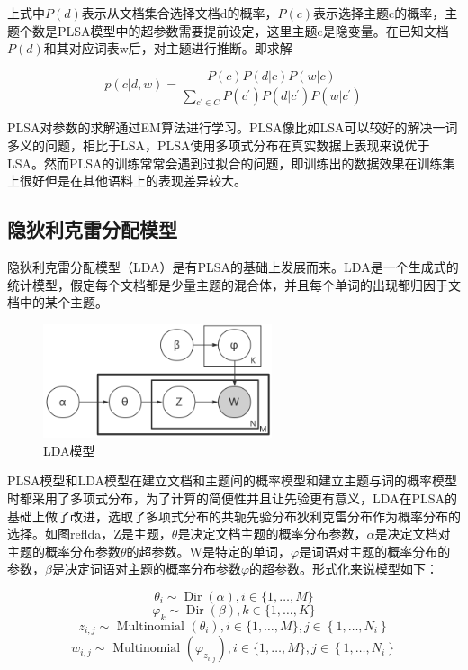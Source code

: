 \documentclass[winfonts,master,oneside,nobackinfo]{njuthesis}
\begin{document}
上式中$P ( d )$表示从文档集合选择文档d的概率，$P ( c )$表示选择主题c的概率，主题个数是PLSA模型中的超参数需要提前设定，这里主题c是隐变量。在已知文档$P ( d )$和其对应词表w后，对主题进行推断。即求解

$$p ( c | d , w ) = \frac { P ( c ) P ( d | c ) P ( w | c ) } { \sum _ { c ^ { \prime } \in C } P \left( c ^ { \prime } \right) P ( d | c ^ { \prime } ) P ( w | c ^ { \prime } ) }$$

PLSA对参数的求解通过EM算法进行学习。PLSA像比如LSA可以较好的解决一词多义的问题，相比于LSA，PLSA使用多项式分布在真实数据上表现来说优于LSA。然而PLSA的训练常常会遇到过拟合的问题，即训练出的数据效果在训练集上很好但是在其他语料上的表现差异较大。

\subsection{隐狄利克雷分配模型}

隐狄利克雷分配模型（LDA）是有PLSA的基础上发展而来。LDA是一个生成式的统计模型，假定每个文档都是少量主题的混合体，并且每个单词的出现都归因于文档中的某个主题。

\begin{figure}[h]
\centering
\includegraphics[width=0.6\textwidth]{./figure/lda.jpg}
\caption{LDA模型}
\label{lda}
\end{figure}

PLSA模型和LDA模型在建立文档和主题间的概率模型和建立主题与词的概率模型时都采用了多项式分布，为了计算的简便性并且让先验更有意义，LDA在PLSA的基础上做了改进，选取了多项式分布的共轭先验分布狄利克雷分布作为概率分布的选择。如图ref{lda}，Z是主题，$\theta$是决定文档主题的概率分布参数，$\alpha$是决定文档对主题的概率分布参数$\theta$的超参数。W是特定的单词，$\varphi$是词语对主题的概率分布的参数，$\beta$是决定词语对主题的概率分布参数$\varphi$的超参数。形式化来说模型如下：

$$\theta _ { i } \sim \operatorname { Dir } ( \alpha ), i \in \{ 1 , \ldots , M \}$$
$$\varphi _ { k } \sim \operatorname { Dir } ( \beta ), k \in \{ 1 , \ldots , K \}$$
$$z _ { i , j } \sim \text { Multinomial } \left( \theta _ { i } \right), i \in \{ 1 , \ldots , M \},j \in \left\{ 1 , \ldots , N _ { i } \right\}$$
$$w _ { i , j } \sim \text { Multinomial } \left( \varphi _ { z _ { i , j } } \right), i \in \{ 1 , \ldots , M \},j \in \left\{ 1 , \ldots , N _ { i } \right\} $$
\end{document}
